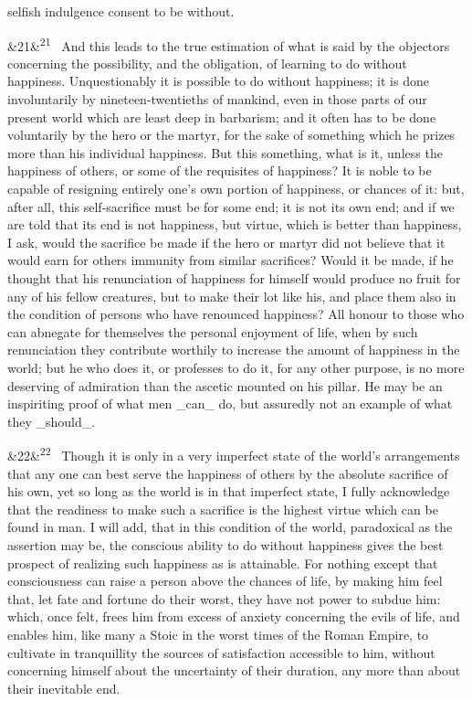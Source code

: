 \documentclass[12pt]{article}
\newcommand{\para}[1][]{\par\noindent\ifx&#1&\else\textsuperscript{\footnotesize #1}~\fi}
\begin{document}
selfish indulgence consent to be without.

\para[21] And this leads to the true estimation of what is said by the objectors concerning the possibility, and the obligation, of learning to do without happiness. Unquestionably it is possible to do without happiness; it is done involuntarily by nineteen-twentieths of mankind, even in those parts of our present world which are least deep in barbarism; and it often has to be done voluntarily by the hero or the martyr, for the sake of something which he prizes more than his individual happiness. But this something, what is it, unless the happiness of others, or some of the requisites of happiness? It is noble to be capable of resigning entirely one's own portion of happiness, or chances of it: but, after all, this self-sacrifice must be for some end; it is not its own end; and if we are told that its end is not happiness, but virtue, which is better than happiness, I ask, would the sacrifice be made if the hero or martyr did not believe that it would earn for others immunity from similar sacrifices? Would it be made, if he thought that his renunciation of happiness for himself would produce no fruit for any of his fellow creatures, but to make their lot like his, and place them also in the condition of persons who have renounced happiness? All honour to those who can abnegate for themselves the personal enjoyment of life, when by such renunciation they contribute worthily to increase the amount of happiness in the world; but he who does it, or professes to do it, for any other purpose, is no more deserving of admiration than the ascetic mounted on his pillar. He may be an inspiriting proof of what men \_can\_ do, but assuredly not an example of what they \_should\_.

\para[22] Though it is only in a very imperfect state of the world's arrangements that any one can best serve the happiness of others by the absolute sacrifice of his own, yet so long as the world is in that imperfect state, I fully acknowledge that the readiness to make such a sacrifice is the highest virtue which can be found in man. I will add, that in this condition of the world, paradoxical as the assertion may be, the conscious ability to do without happiness gives the best prospect of realizing such happiness as is attainable. For nothing except that consciousness can raise a person above the chances of life, by making him feel that, let fate and fortune do their worst, they have not power to subdue him: which, once felt, frees him from excess of anxiety concerning the evils of life, and enables him, like many a Stoic in the worst times of the Roman Empire, to cultivate in tranquillity the sources of satisfaction accessible to him, without concerning himself about the uncertainty of their duration, any more than about their inevitable end.
\end{document}
